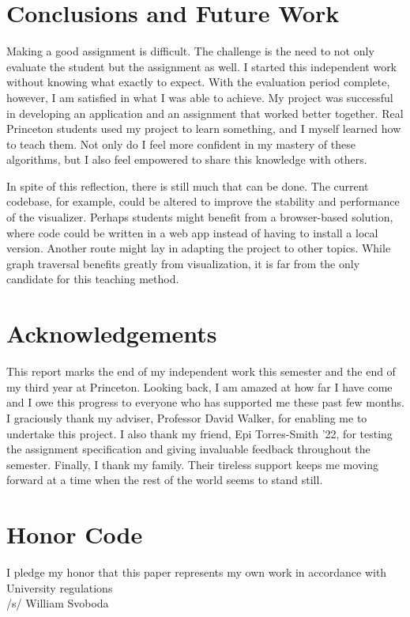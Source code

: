 \documentclass[pageno]{jpaper}
\begin{document}
\section{Conclusions and Future Work}

Making a good assignment is difficult. The challenge is the need to not only evaluate the student but the assignment as well. I started this independent work without knowing what exactly to expect. With the evaluation period complete, however, I am satisfied in what I was able to achieve. My project was successful in developing an application and an assignment that worked better together. Real Princeton students used my project to learn something, and I myself learned how to teach them. Not only do I feel more confident in my mastery of these algorithms, but I also feel empowered to share this knowledge with others.

In spite of this reflection, there is still much that can be done. The current codebase, for example, could be altered to improve the stability and performance of the visualizer. Perhaps students might benefit from a browser-based solution, where code could be written in a web app instead of having to install a local version. Another route might lay in adapting the project to other topics. While graph traversal benefits greatly from visualization, it is far from the only candidate for this teaching method.

\section*{Acknowledgements}

This report marks the end of my independent work this semester and the end of my third year at Princeton. Looking back, I am amazed at how far I have come and I owe this progress to everyone who has supported me these past few months. I graciously thank my adviser, Professor David Walker, for enabling me to undertake this project. I also thank my friend, Epi Torres-Smith '22, for testing the assignment specification and giving invaluable feedback throughout the semester. Finally, I thank my family. Their tireless support keeps me moving forward at a time when the rest of the world seems to stand still.

\section*{Honor Code}

I pledge my honor that this paper represents my own work in accordance with University regulations \\/s/ William Svoboda
\end{document}
